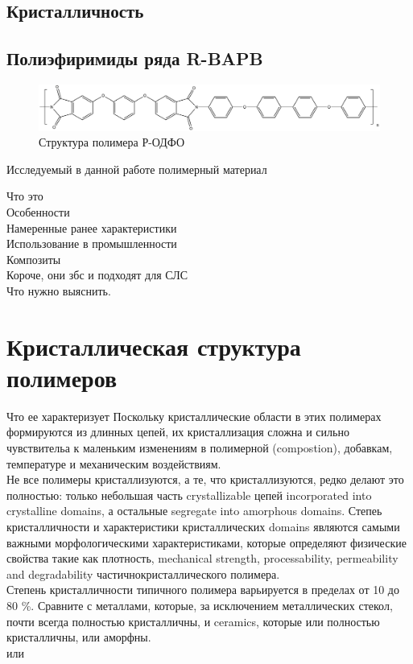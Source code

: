\subsection{Кристалличность}

\subsection{Полиэфиримиды ряда R-BAPB }
		
	\begin{figure}[h]
	\includegraphics[width=\textwidth]{fig/formula.png}
	\caption{Структура полимера Р-ОДФО \cite{pi-formula}}
	\label{fig:formula}
	\end{figure}

Исследуемый в данной работе полимерный материал 


Что это\\
Особенности\\
Намеренные ранее характеристики\\
Использование в промышленности\\
Композиты\\
Короче, они збс и подходят для СЛС\\
Что нужно выяснить.\\

\section{Кристаллическая структура полимеров}

Что ее характеризует
Поскольку кристаллические области в этих полимерах формируются из длинных цепей, их кристаллизация сложна и сильно чувствительа к маленьким изменениям в полимерной (compostion), добавкам, температуре и механическим воздействиям.\\
Не все полимеры кристаллизуются, а те, что кристаллизуются, редко делают это полностью: только небольшая часть crystallizable цепей incorporated into crystalline domains, а остальные segregate into amorphous domains. Степеь кристалличности и характеристики кристаллических domains являются самыми важными морфологическими характеристиками, которые определяют физические свойства такие как плотность, mechanical strength, processability, permeability and degradability частичнокристаллического полимера.\\
Степень кристалличности типичного полимера варьируется в пределах от 10 до 80 \%. Сравните с металлами, которые, за исключением металлических стекол, почти всегда полностью кристалличны, и ceramics, которые или полностью кристалличны, или аморфны.\\ \cite{cryst3} или \cite{cryst1}






